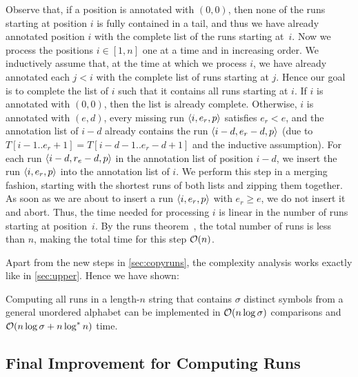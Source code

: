 Observe that, if a position is annotated with $(0,0)$, then none of the runs starting at position $i$ is fully contained in a tail, and thus we have already annotated position $i$ with the complete list of the runs starting at~$i$. 
Now we process the positions $i \in [1, n]$ one at a time and in increasing order.
We inductively assume that, at the time at which we process $i$, we have already annotated each $j < i$ with the complete list of runs starting at $j$. Hence our goal is to complete the list of $i$ such that it contains all runs starting at $i$. If $i$ is annotated with $(0,0)$, then the list is already complete.
Otherwise, $i$ is annotated with $(e, d)$, every missing run $\left\langle i, e_r, p\right\rangle$ satisfies $e_r < e$, and the annotation list of $i - d$ already contains the run $\left\langle i - d, e_r - d, p\right\rangle$ (due to $T[i - 1..e_r + 1] = T[i - d - 1..e_r - d + 1]$ and the inductive assumption).
For each run $\left\langle i - d, r_e - d, p\right\rangle$ in the annotation list of position $i - d$, we insert the run $\left\langle i, e_r, p\right\rangle$ into the annotation list of $i$. We perform this step in a merging fashion, starting with the shortest runs of both lists and zipping them together. As soon as we are about to insert a run $\left\langle i, e_r, p\right\rangle$ with $e_r \geq e$, we do not insert it and abort. Thus, the time needed for processing $i$ is linear in the number of runs starting at position~$i$. By the runs theorem~\cite{Bannai2017}, the total number of runs is less than $n$, making the total time for this step $\mathcal{O}(n)$.

Apart from the new steps in \cref{sec:copyruns}, the complexity analysis works exactly like in \cref{sec:upper}. Hence we have shown:

\begin{theorem}
\label{thm:runsstar}
Computing all runs in a length-$n$ string that contains $\sigma$ distinct symbols from a general unordered alphabet can be implemented in $\mathcal{O}(n\log \sigma)$ comparisons and $\mathcal{O}(n\log \sigma + n \log^* n)$ time.
\end{theorem}

\subsection{Final Improvement for Computing Runs}

